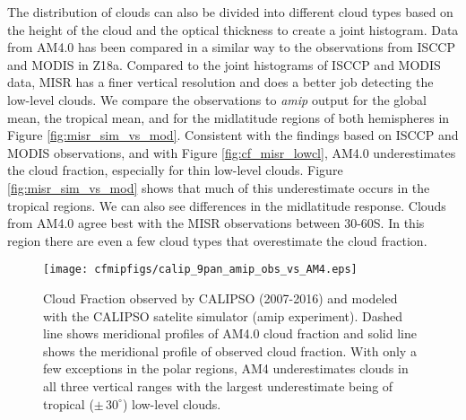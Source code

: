 \documentclass[draft]{agujournal2019}
\begin{document}
The distribution of clouds can also be divided into different cloud types based on the height of the cloud and
the optical thickness to create a joint histogram.  
Data from AM4.0 has been compared in a similar way to the observations from ISCCP and MODIS in Z18a.  
Compared to the joint histograms of ISCCP and MODIS data, MISR has a finer
vertical resolution and does a better job detecting the low-level clouds.  We compare the observations to 
\textit{amip} output for the global mean, the tropical mean, and for the midlatitude regions of both hemispheres 
in Figure \ref{fig:misr_sim_vs_mod}.
Consistent with the findings based on ISCCP and MODIS observations, and with Figure \ref{fig:cf_misr_lowcl},
AM4.0 underestimates the cloud fraction, especially for thin low-level clouds.  Figure \ref{fig:misr_sim_vs_mod}
shows that much of this underestimate occurs in the tropical regions.  We can also see differences in the
midlatitude response.  Clouds from AM4.0 agree best with the MISR observations between 30-60S.  In this 
region there are even a few cloud types that overestimate the cloud fraction.  

\begin{figure}
  \centering
  \texttt{[image: cfmipfigs/calip\_9pan\_amip\_obs\_vs\_AM4.eps]}
  \caption{Cloud Fraction observed by CALIPSO (2007-2016) and modeled with the CALIPSO satelite simulator 
  (amip experiment).
  Dashed line shows meridional profiles of AM4.0 cloud fraction and solid line shows
  the meridional profile of observed cloud fraction.  With only a few exceptions in the polar regions, AM4 underestimates
  clouds in all three vertical ranges with the largest underestimate being of tropical ($\pm \, 30^\circ$) low-level clouds.}
  \label{fig:calipso_9pan}
\end{figure}
\end{document}
